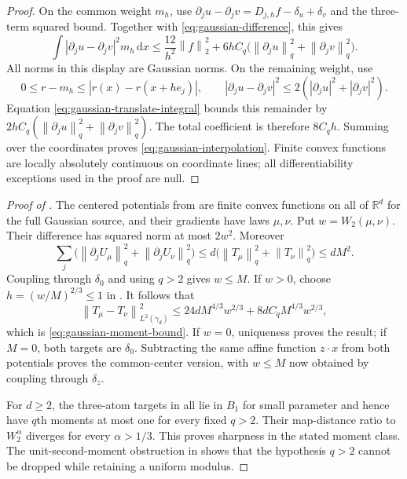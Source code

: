 \documentclass[11pt]{article}
\numberwithin{equation}{section}
\theoremstyle{remark}
\newcommand{\R}{\mathbb R}
\newcommand{\dd}{\,\mathrm d}
\newcommand{\norm}[1]{\left\lVert #1\right\rVert}
\begin{document}
\begin{proof}
On the common weight $m_h$, use
$\partial_j u-\partial_j v=D_{j,h}f-\delta_u+\delta_v$ and the three-term squared bound. Together with \eqref{eq:gaussian-difference}, this gives
\[
 \int|\partial_j u-\partial_j v|^2m_h\dd x
 \le\frac{12}{h^2}\norm f_2^2
       +6hC_q\bigl(\norm{\partial_j u}_q^2+\norm{\partial_j v}_q^2\bigr).
\]
All norms in this display are Gaussian norms. On the remaining weight, use
\[
 0\le r-m_h\le|r(x)-r(x+he_j)|,
 \qquad |\partial_j u-\partial_j v|^2
          \le2(|\partial_j u|^2+|\partial_j v|^2).
\]
Equation \eqref{eq:gaussian-translate-integral} bounds this remainder by
$2hC_q(\norm{\partial_j u}_q^2+\norm{\partial_j v}_q^2)$. The total coefficient is therefore $8C_qh$. Summing over the coordinates proves \eqref{eq:gaussian-interpolation}. Finite convex functions are locally absolutely continuous on coordinate lines; all differentiability exceptions used in the proof are null.
\end{proof}

\begin{proof}[Proof of ]
The centered potentials from  are finite convex functions on all of $\R^d$ for the full Gaussian source, and their gradients have laws $\mu,\nu$. Put $w=W_2(\mu,\nu)$. Their difference has squared norm at most $2w^2$. Moreover
\[
 \sum_j\bigl(\norm{\partial_j U_\mu}_q^2+
                    \norm{\partial_j U_\nu}_q^2\bigr)
 \le d\bigl(\norm{T_\mu}_q^2+\norm{T_\nu}_q^2\bigr)\le dM^2.
\]
Coupling through $\delta_0$ and using $q>2$ gives $w\le M$. If $w>0$, choose $h=(w/M)^{2/3}\le1$ in . It follows that
\[
 \norm{T_\mu-T_\nu}_{L^2(\gamma_d)}^2
 \le24dM^{4/3}w^{2/3}+8dC_qM^{4/3}w^{2/3},
\]
which is \eqref{eq:gaussian-moment-bound}. If $w=0$, uniqueness proves the result; if $M=0$, both targets are $\delta_0$. Subtracting the same affine function $z\cdot x$ from both potentials proves the common-center version, with $w\le M$ now obtained by coupling through $\delta_z$.

For $d\ge2$, the three-atom targets in  all lie in $B_1$ for small parameter and hence have $q$th moments at most one for every fixed $q>2$. Their map-distance ratio to $W_2^\alpha$ diverges for every $\alpha>1/3$. This proves sharpness in the stated moment class. The unit-second-moment obstruction in  shows that the hypothesis $q>2$ cannot be dropped while retaining a uniform modulus.
\end{proof}
\end{document}
